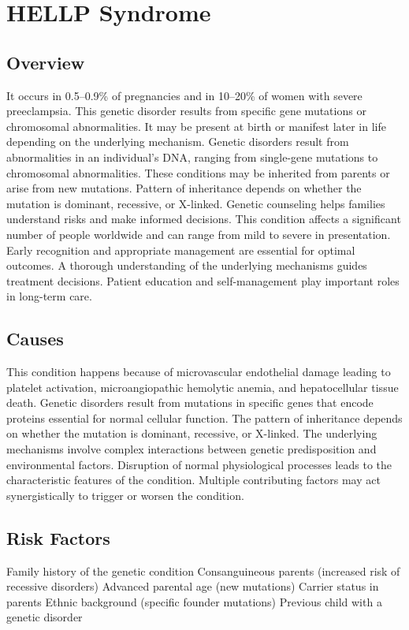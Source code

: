\chapter{HELLP Syndrome}
\label{sec:HELLP Syndrome}

\section{Overview}
It occurs in 0.5--0.9\% of pregnancies and in 10--20\% of women with severe preeclampsia. This genetic disorder results from specific gene mutations or chromosomal abnormalities. It may be present at birth or manifest later in life depending on the underlying mechanism. Genetic disorders result from abnormalities in an individual's DNA, ranging from single-gene mutations to chromosomal abnormalities. These conditions may be inherited from parents or arise from new mutations. Pattern of inheritance depends on whether the mutation is dominant, recessive, or X-linked. Genetic counseling helps families understand risks and make informed decisions. This condition affects a significant number of people worldwide and can range from mild to severe in presentation. Early recognition and appropriate management are essential for optimal outcomes. A thorough understanding of the underlying mechanisms guides treatment decisions. Patient education and self-management play important roles in long-term care.
\section{Causes}
This condition happens because of microvascular endothelial damage leading to platelet activation, microangiopathic hemolytic anemia, and hepatocellular tissue death. Genetic disorders result from mutations in specific genes that encode proteins essential for normal cellular function. The pattern of inheritance depends on whether the mutation is dominant, recessive, or X-linked. The underlying mechanisms involve complex interactions between genetic predisposition and environmental factors. Disruption of normal physiological processes leads to the characteristic features of the condition. Multiple contributing factors may act synergistically to trigger or worsen the condition.
\section{Risk Factors}
Family history of the genetic condition Consanguineous parents (increased risk of recessive disorders) Advanced parental age (new mutations) Carrier status in parents Ethnic background (specific founder mutations) Previous child with a genetic disorder

